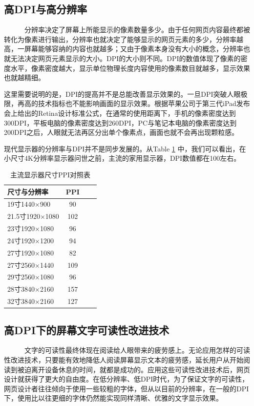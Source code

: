 \documentclass[a4paper]{article}
\begin{document}
\subsection{高DPI与高分辨率}
~~~~~~分辨率决定了屏幕上所能显示的像素数量多少。由于任何网页内容最终都被转化为像素进行输出，分辨率也就决定了能够显示的网页元素的多少，分辨率越高，一屏幕能够容纳的内容也就越多；又由于像素本身没有大小的概念，分辨率也就无法决定网页元素显示的大小。DPI的大小则不同。DPI的数值体现了像素的密度水平，像素密度越大，显示单位物理长度内容使用的像素数目就越多，显示效果也就越精细。

这里需要说明的是，DPI的提高并不是总能改善显示效果的。一旦DPI突破人眼极限，再高的技术指标也不能影响画面的显示效果。根据苹果公司于第三代iPad发布会上给出的Retina设计标准公式，在通常的使用距离下，手机的像素密度达到300DPI，平板电脑的像素密度达到260DPI，PC与笔记本电脑的像素密度达到200DPI之后，人眼就无法再区分出单个像素点，画面也就不会再出现颗粒感。

现代显示器的分辨率与DPI并不是同步发展的。从Table \ref{tb2} 中，我们可以看出，在小尺寸4K分辨率显示器问世之前，主流的家用显示器，DPI数值都在100左右。

\begin{table}[h]
\centering
\begin{tabular}{lccc}  %
\hline
尺寸与分辨率 & PPI \\\hline
19寸1440×900 & 90 \\
21.5寸1920×1080 & 102 \\
23寸1920×1080 & 96 \\
24寸1920×1200  & 94 \\
27寸1920×1080 & 82 \\
27寸2560×1440 & 109 \\
29寸2560×1080 & 96 \\
28寸3840×2160 & 157 \\
32寸3840×2160 & 127\\ \hline
\end{tabular}
\caption{主流显示器尺寸PPI对照表}
\label{tb2}
\end{table}

\subsection{高DPI下的屏幕文字可读性改进技术}
~~~~~~文字的可读性最终体现在阅读给人眼带来的疲劳感上。无论应用怎样的可读性改进技术，只要能有效地降低人阅读屏幕显示文本的疲劳感，延长用户从开始阅读到被迫离开设备休息的时间，就都是成功的。应用这些可读性改进技术后，网页设计就获得了更大的自由度。在低分辨率、低DPI时代，为了保证文字的可读性，网页设计者往往倾向于使用一些较粗的字体，但从以目前的分辨率，在一般的DPI下，使用比以往更细的字体仍然能实现同样清晰、优雅的文字显示效果。
\end{document}
